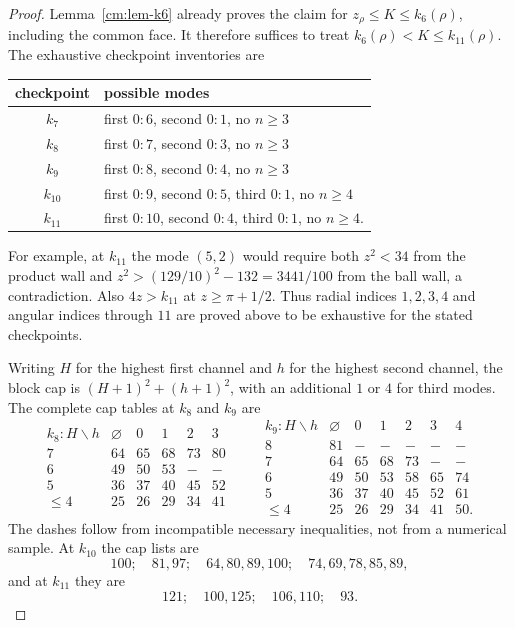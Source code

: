 \documentclass[11pt]{article}
\numberwithin{equation}{section}
\theoremstyle{definition}
\theoremstyle{remark}
\begin{document}
\begin{proof}
Lemma~\ref{cm:lem-k6} already proves the claim for
\(z_\rho\leq K\leq k_6(\rho)\), including the common face.  It therefore
suffices to treat \(k_6(\rho)<K\leq k_{11}(\rho)\).
The exhaustive checkpoint inventories are
\begin{center}
\small
\begin{tabular}{c|l}
checkpoint&possible modes\\ \hline
\(k_7\)&first \(0{:}6\), second \(0{:}1\), no \(n\geq3\)\\
\(k_8\)&first \(0{:}7\), second \(0{:}3\), no \(n\geq3\)\\
\(k_9\)&first \(0{:}8\), second \(0{:}4\), no \(n\geq3\)\\
\(k_{10}\)&first \(0{:}9\), second \(0{:}5\), third \(0{:}1\), no \(n\geq4\)\\
\(k_{11}\)&first \(0{:}10\), second \(0{:}4\), third \(0{:}1\), no \(n\geq4\).
\end{tabular}
\end{center}
For example, at \(k_{11}\) the mode \((5,2)\) would require both
\(z^2<34\) from the product wall and
\(z^2>(129/10)^2-132=3441/100\) from the ball wall, a contradiction.
Also \(4z>k_{11}\) at \(z\geq\pi+1/2\).  Thus radial indices
\(1,2,3,4\) and angular indices through \(11\) are proved above to be
exhaustive for the stated checkpoints.

Writing \(H\) for the highest first channel and \(h\) for the highest
second channel, the block cap is \((H+1)^2+(h+1)^2\), with an additional
\(1\) or \(4\) for third modes.  The complete cap tables at \(k_8\) and
\(k_9\) are
\[
\begin{array}{c|ccccc}
k_8:H\backslash h&\varnothing&0&1&2&3\\ \hline
7&64&65&68&73&80\\
6&49&50&53&-&-\\
5&36&37&40&45&52\\
\leq4&25&26&29&34&41
\end{array}
\qquad
\begin{array}{c|cccccc}
k_9:H\backslash h&\varnothing&0&1&2&3&4\\ \hline
8&81&-&-&-&-&-\\
7&64&65&68&73&-&-\\
6&49&50&53&58&65&74\\
5&36&37&40&45&52&61\\
\leq4&25&26&29&34&41&50.
\end{array}
\]
The dashes follow from incompatible necessary inequalities, not from a
numerical sample.  At \(k_{10}\) the cap lists are
\[
 100;\quad81,97;\quad64,80,89,100;\quad74,69,78,85,89,
\]
and at \(k_{11}\) they are
\[
 121;\quad100,125;\quad106,110;\quad93.
\]


\end{proof}
\end{document}
